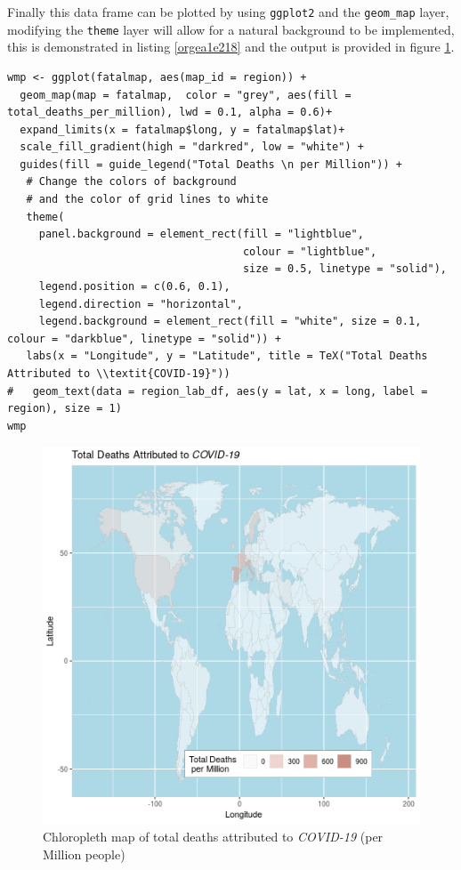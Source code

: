 \documentclass[11pt]{article}
\begin{document}
Finally this data frame can be plotted by using \texttt{ggplot2} and the \texttt{geom\_map}
layer, modifying the \texttt{theme} layer will allow for a natural background to be implemented,
this is demonstrated in listing \ref{orgea1e218} and the output is provided in figure \ref{fig:orgbde4873}.

\begin{listing}[htbp]
\begin{verbatim}
wmp <- ggplot(fatalmap, aes(map_id = region)) +
  geom_map(map = fatalmap,  color = "grey", aes(fill = total_deaths_per_million), lwd = 0.1, alpha = 0.6)+
  expand_limits(x = fatalmap$long, y = fatalmap$lat)+
  scale_fill_gradient(high = "darkred", low = "white") +
  guides(fill = guide_legend("Total Deaths \n per Million")) +
   # Change the colors of background
   # and the color of grid lines to white
   theme(
     panel.background = element_rect(fill = "lightblue",
                                     colour = "lightblue",
                                     size = 0.5, linetype = "solid"),
     legend.position = c(0.6, 0.1),
     legend.direction = "horizontal",
     legend.background = element_rect(fill = "white", size = 0.1, colour = "darkblue", linetype = "solid")) +
   labs(x = "Longitude", y = "Latitude", title = TeX("Total Deaths Attributed to \\textit{COVID-19}"))
#   geom_text(data = region_lab_df, aes(y = lat, x = long, label = region), size = 1)
wmp

\end{verbatim}
\caption{\label{orgea1e218}use \texttt{ggplot2} to create a chloropleth map from data, output in figure \ref{fig:orgbde4873}}
\end{listing}


\begin{figure}[htbp]
\centering
\includegraphics[width=16cm]{FirstChALL.png}
\caption{\label{fig:orgbde4873}Chloropleth map of total deaths attributed to \emph{COVID-19} (per Million people)}
\end{figure}
\end{document}
